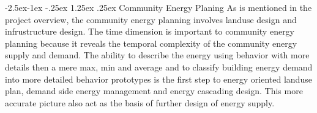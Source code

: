 \documentclass[hidelinks,12pt]{article}
\makeatletter
\renewcommand\paragraph{\@startsection{paragraph}{4}{\z@}%
            {-2.5ex\@plus -1ex \@minus -.25ex}%
            {1.25ex \@plus .25ex}%
            {\normalfont\normalsize\bfseries}}
\makeatother
\begin{document}
\paragraph{Community Energy Planing}
As is mentioned in the project overview, the community energy planning
involves landuse design and infrustructure design. The time dimension
is important to community energy planning because it reveals the
temporal complexity of the community energy supply and demand. The
ability to describe the energy using behavior with more details then a
mere max, min and average and to classify building energy demand into
more detailed behavior prototypes is the first step to energy oriented
landuse plan, demand side energy management and energy cascading
design. This more accurate picture also act as the basis of further
design of energy supply.
\end{document}

